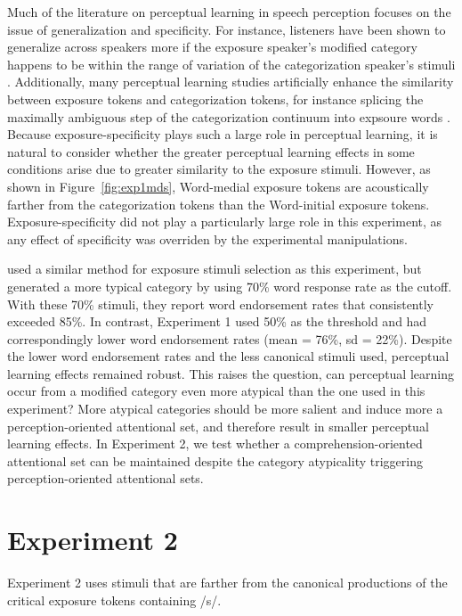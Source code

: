 Much of the literature on perceptual learning in speech perception focuses on the issue of generalization and specificity.
For instance, listeners have been shown to generalize across speakers more if the exposure speaker's modified category happens to be within the range of variation of the categorization speaker's stimuli \citep{Eisner2005,Kraljic2005}.
Additionally, many perceptual learning studies artificially enhance the similarity between exposure tokens and categorization tokens, for instance splicing the maximally ambiguous step of the categorization continuum into expsoure words \citep{Norris2003}.
Because exposure-specificity plays such a large role in perceptual learning, it is natural to consider whether the greater perceptual learning effects in some conditions arise due to greater similarity to the exposure stimuli.
However, as shown in Figure~\ref{fig:exp1mds}, Word-medial exposure tokens are acoustically farther from the categorization tokens than the Word-initial exposure tokens.  
Exposure-specificity did not play a particularly large role in this experiment, as any effect of specificity was overriden by the experimental manipulations.

\citet{Reinisch2013} used a similar method for exposure stimuli selection as this experiment, but generated a more typical category by using 70\% word response rate as the cutoff.  
With these 70\% stimuli, they report word endorsement rates that consistently exceeded 85\%.
In contrast, Experiment 1 used 50\% as the threshold and had correspondingly lower word endorsement rates (mean = 76\%, sd = 22\%).  
Despite the lower word endorsement rates and the less canonical stimuli used, perceptual learning effects remained robust.
This raises the question, can perceptual learning occur from a modified category even more atypical than the one used in this experiment?
More atypical categories should be more salient and induce more a perception-oriented attentional set, and therefore result in smaller perceptual learning effects.
In Experiment 2, we test whether a comprehension-oriented attentional set can be maintained despite the category atypicality triggering perception-oriented attentional sets.

\section{Experiment 2}

Experiment 2 uses stimuli that are farther from the canonical productions of the critical exposure tokens containing /s/.

